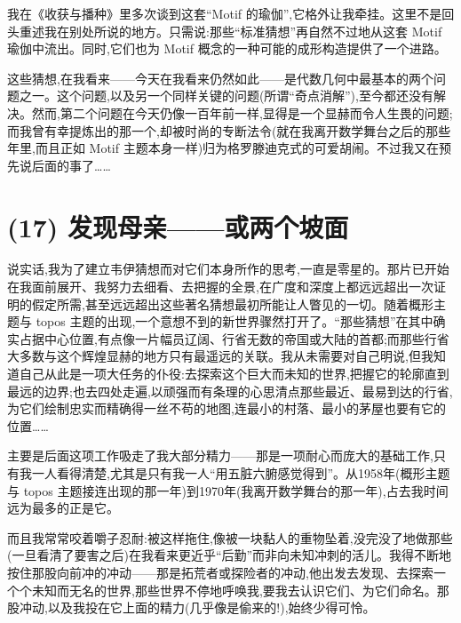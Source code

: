  我在《收获与播种》里多次谈到这套“Motif 的瑜伽”,它格外让我牵挂。这里不是回头重述我在别处所说的地方。只需说:那些“标准猜想”再自然不过地从这套 Motif 瑜伽中流出。同时,它们也为 Motif 概念的一种可能的成形构造提供了一个进路。

这些猜想,在我看来——今天在我看来仍然如此——是代数几何中最基本的两个问题之一。这个问题,以及另一个同样关键的问题(所谓“奇点消解”),至今都还没有解决。然而,第二个问题在今天仍像一百年前一样,显得是一个显赫而令人生畏的问题;而我曾有幸提炼出的那一个,却被时尚的专断法令(就在我离开数学舞台之后的那些年里,而且正如 Motif 主题本身一样)归为格罗滕迪克式的可爱胡闹。不过我又在预先说后面的事了……

\section{(17) 发现母亲——或两个坡面}

说实话,我为了建立韦伊猜想而对它们本身所作的思考,一直是零星的。那片已开始在我面前展开、我努力去细看、去把握的全景,在广度和深度上都远远超出一次证明的假定所需,甚至远远超出这些著名猜想最初所能让人瞥见的一切。随着概形主题与 topos 主题的出现,一个意想不到的新世界骤然打开了。“那些猜想”在其中确实占据中心位置,有点像一片幅员辽阔、行省无数的帝国或大陆的首都;而那些行省大多数与这个辉煌显赫的地方只有最遥远的关联。我从未需要对自己明说,但我知道自己从此是一项大任务的仆役:去探索这个巨大而未知的世界,把握它的轮廓直到最远的边界;也去四处走遍,以顽强而有条理的心思清点那些最近、最易到达的行省,为它们绘制忠实而精确得一丝不苟的地图,连最小的村落、最小的茅屋也要有它的位置……

主要是后面这项工作吸走了我大部分精力——那是一项耐心而庞大的基础工作,只有我一人看得清楚,尤其是只有我一人“用五脏六腑感觉得到”。从1958年(概形主题与 topos 主题接连出现的那一年)到1970年(我离开数学舞台的那一年),占去我时间远为最多的正是它。

而且我常常咬着嚼子忍耐:被这样拖住,像被一块黏人的重物坠着,没完没了地做那些(一旦看清了要害之后)在我看来更近乎“后勤”而非向未知冲刺的活儿。我得不断地按住那股向前冲的冲动——那是拓荒者或探险者的冲动,他出发去发现、去探索一个个未知而无名的世界,那些世界不停地呼唤我,要我去认识它们、为它们命名。那股冲动,以及我投在它上面的精力(几乎像是偷来的!),始终少得可怜。

